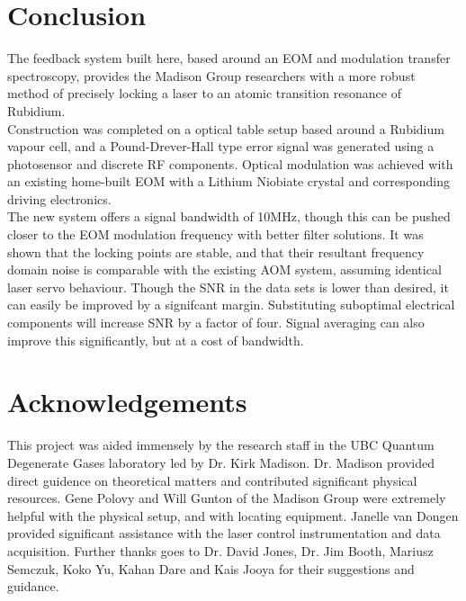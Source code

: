 \newpage
\section{Conclusion}

The feedback system built here, based around an EOM and modulation transfer spectroscopy, provides the Madison Group researchers with a more robust method of precisely locking a laser to an atomic transition resonance of Rubidium. \\

Construction was completed on a optical table setup based around a Rubidium vapour cell, and a Pound-Drever-Hall type error signal was generated using a photosensor and discrete RF components. Optical modulation was achieved with an existing home-built EOM with a Lithium Niobiate crystal and corresponding driving electronics.\\

The new system offers a signal bandwidth of 10MHz, though this can be pushed closer to the EOM modulation frequency with better filter solutions. It was shown that the locking points are stable, and that their resultant frequency domain noise is comparable with the existing AOM system, assuming identical laser servo behaviour. Though the SNR in the data sets is lower than desired, it can easily be improved by a signifcant margin. Substituting suboptimal electrical components will increase SNR by a factor of four. Signal averaging can also improve this significantly, but at a cost of bandwidth. \\

\section*{Acknowledgements}

This project was aided immensely by the research staff in the UBC Quantum Degenerate Gases laboratory led by Dr. Kirk Madison. Dr. Madison provided direct guidence on theoretical matters and contributed significant physical resources. Gene Polovy and Will Gunton of the Madison Group were extremely helpful with the physical setup, and with locating equipment. Janelle van Dongen provided significant assistance with the laser control instrumentation and data acquisition. Further thanks goes to Dr. David Jones, Dr. Jim Booth, Mariusz Semczuk, Koko Yu, Kahan Dare and Kais Jooya for their suggestions and guidance.